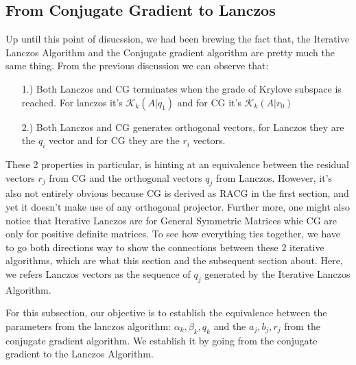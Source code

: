 \documentclass[]{article}
\theoremstyle{definition}
\begin{document}
    \subsection{From Conjugate Gradient to Lanczos}
        Up until this point of disucssion, we had been brewing the fact that, the Iterative Lanczos Algorithm and the Conjugate gradient algorithm are pretty much the same thing. From the previous discussion we can observe that: 
        \begin{enumerate}
            \item [1.)] Both Lanczos and CG terminates when the grade of Krylove subspace is reached. For lanczos it's $\mathcal K_k(A|q_1)$ and for CG it's $\mathcal K_k(A|r_0)$
            \item [2.)] Both Lanczos and CG generates orthogonal vectors, for Lanczos they are the $q_i$ vector and for CG they are the $r_i$ vectors. 
        \end{enumerate}
        These 2 properties in particular, is hinting at an equivalence between the residual vectors $r_j$ from CG and the orthogonal vectors $q_j$ from Lanczos. However, it's also not entirely obvious because CG is derived as RACG in the first section, and yet it doesn't make use of any orthogonal projector. Further more, one might also notice that Iterative Lanczos are for General Symmetric Matrices whie CG are only for positive definite matrices. To see how everything ties together, we have to go both directions way to show the connections between these 2 iterative algorithms, which are what this section and the subsequent section about. Here, we refers Lanczos vectors as the sequence of $q_j$ generated by the Iterative Lanczos Algorithm. 
        \par
        For this subsection, our objective is to establish the equivalence between the parameters from the lanczos algorithm: $\alpha_k, \beta_k, q_k$ and the $a_j, b_j, r_j$ from the conjugate gradient algorithm. We establish it by going from the conjugate gradient to the Lanczos Algorithm. 
\end{document}
